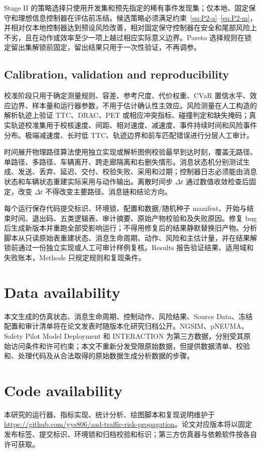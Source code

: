 \documentclass[10pt,a4paper,twocolumn]{article}
\begin{document}
Stage II 的策略选择只使用开发集和预先指定的稀有事件发现集；仅本地、固定保守和理想信息控制器在评估前冻结。候选策略必须满足约束~\eqref{eq:P2-a}--\eqref{eq:P2-m}，并相对仅本地控制器达到预设风险改善，相对固定保守控制器在安全和尾部风险上不劣，且在动作或效率至少一项上越过相应实际意义边界。Pareto 选择规则在锁定留出集解锁前固定，留出结果只用于一次性验证，不再调参。

\subsection*{Calibration, validation and reproducibility}
校准阶段只用于确定测量规则、容差、参考尺度、代价权重、CVaR 置信水平、效应边界、样本量和运行器参数，不用于估计确认性主效应。风险测量在人工构造的解析轨迹上验证 TTC、DRAC、PET 或相应冲突指标、碰撞判定和缺失掩码；真实轨迹校准集用于校核速度、间距、相对速度、减速度、事件持续时间和风险事件分布。极端减速度、长时低 TTC、轨迹边界和前车匹配错误进行分层人工审计。

时间展开物理路径算法使用独立实现或解析图例校验最早到达时刻，覆盖无路径、单路径、多路径、车辆离开、跨走廊隔离和右删失情形。消息状态机分别测试生成、发送、丢弃、延迟、交付、校验失败、采用和过期；控制器日志必须能由消息状态和车辆状态重建实际采用与动作输出。离散时间步 $\Delta t$ 通过数值收敛检查后固定，改变 $\Delta t$ 不得改变主要路径、消息链和结论方向。

每个运行保存代码提交标识、环境锁、配置和数据/随机种子 manifest、开始与结束时间、退出码、五类逻辑表、审计摘要、原始产物校验和及失败原因。修复 bug 后生成新版本并重跑全部受影响运行；不得用修复后的结果静默替换旧产物。分析脚本从只读原始表重建状态、消息生命周期、动作、风险和主估计量，并在结果解锁前通过一份独立实现或人工可审计样例复核。Results 报告验证结果、适用域和失败账本，Methods 只规定规则和复现条件。

\section*{Data availability}
本文生成的仿真状态、消息生命周期、控制动作、风险结果、Source Data、冻结配置和审计清单将在论文发表时随版本化研究归档公开。NGSIM、pNEUMA、Safety Pilot Model Deployment 和 INTERACTION 为第三方数据，分别受其原始访问条件和许可约束；本文不重新分发受限原始数据，但提供数据清单、校验和、处理代码及从合法取得的原始数据生成分析数据的步骤。

\section*{Code availability}
本研究的运行器、指标实现、统计分析、绘图脚本和复现说明维护于 \url{https://github.com/yys806/aad-traffic-risk-propagation}。论文对应版本将以固定发布标签、提交标识、环境锁和归档校验和标识；第三方仿真器与依赖软件按各自许可获取。
\end{document}
